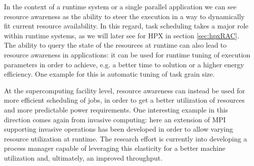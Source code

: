 In the context of a runtime system or a single parallel application we can see resource awareness as the ability to steer the execution in a way to dynamically fit current resource availability. In this regard, task scheduling takes a major role within runtime systems, as we will later see for HPX in section \ref{sec:hpxRAC}. The ability to query the state of the resources at runtime can also lead to resource awareness in applications: it can be used for runtime tuning of execution parameters in order to achieve, e.g. a better time to solution or a higher energy efficiency. One example for this is automatic tuning of task grain size\cite{grubel2016dynamic}.

At the supercomputing facility level, resource awareness can instead be used for more efficient scheduling of jobs, in order to get a better utilization of resources and more predictable power requirements. One interesting example in this direction comes again from invasive computing: here an extension of MPI supporting invasive operations has been developed in order to allow varying resource utilization at runtime\cite{urena2012invasive}. The research effort is currently into developing a process manager capable of leveraging this elasticity for a better machine utilization and, ultimately, an improved throughput.


